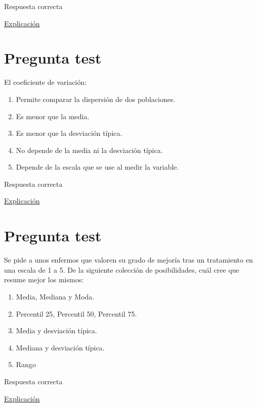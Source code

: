 \documentclass[
]{book}
\providecommand{\tightlist}{%
  \setlength{\itemsep}{0pt}\setlength{\parskip}{0pt}}
\begin{document}
Respuesta correcta

\href{https://www.statisticshowto.com/what-is-a-bimodal-distribution/}{Explicación}

\hypertarget{pregunta-test-64}{%
\section{Pregunta test}\label{pregunta-test-64}}

El coeficiente de variación:

\begin{enumerate}
\def\labelenumi{\alph{enumi})}
\tightlist
\item
  Permite comparar la dispersión de dos poblaciones.
\item
  Es menor que la media.
\item
  Es menor que la desviación típica.
\item
  No depende de la media ni la desviación típica.
\item
  Depende de la escala que se use al medir la variable.
\end{enumerate}

Respuesta correcta

\href{https://en.wikipedia.org/wiki/Coefficient_of_variation}{Explicación}

\hypertarget{pregunta-test-65}{%
\section{Pregunta test}\label{pregunta-test-65}}

Se pide a unos enfermos que valoren su grado de mejoría tras un tratamiento en una escala de 1 a 5. De la siguiente colección de posibilidades, cuál cree que resume mejor los mismos:

\begin{enumerate}
\def\labelenumi{\alph{enumi})}
\tightlist
\item
  Media, Mediana y Moda.
\item
  Percentil 25, Percentil 50, Percentil 75.
\item
  Media y desviación típica.
\item
  Mediana y desviación típica.
\item
  Rango
\end{enumerate}

Respuesta correcta

\href{https://1fjmanzano.github.io/bioestadistica/medidas-de-posicio\%CC\%81n-dispersio\%CC\%81n-y-forma.html\#medidas-de-dispersio\%CC\%81n}{Explicación}
\end{document}
